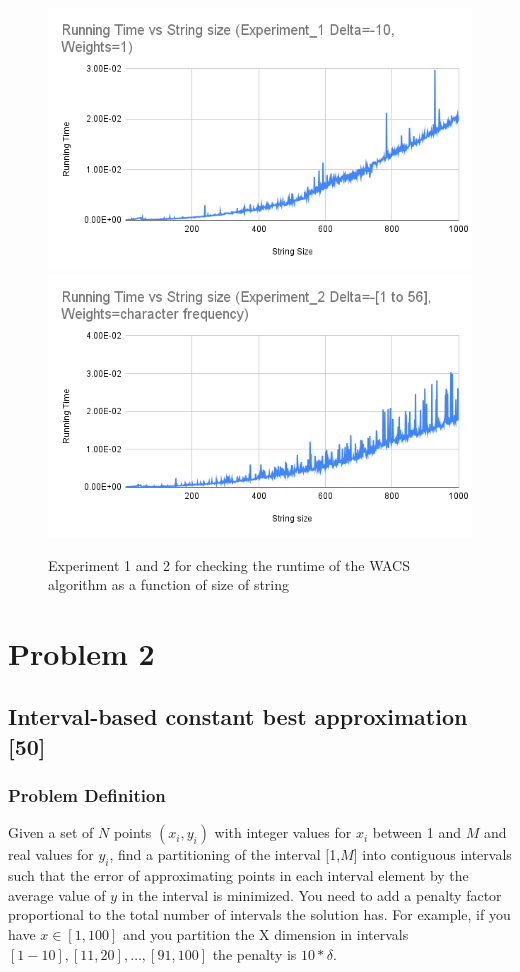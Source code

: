 \documentclass{article}
\begin{document}
\begin{figure}[htp]
    \centering
    \includegraphics[width=.40\textwidth]{Running Time vs String size (Experiment_1 Delta=-10, Weights=1).png}
    \includegraphics[width=.40\textwidth]{Running Time vs String size (Experiment_2 Delta=-[1 to 56], Weights=character frequency).png}
    \caption{Experiment 1 and 2 for checking the runtime of the WACS algorithm as a function of size of string}
    \label{fig:WACSrun}
\end{figure}
\clearpage
\section*{Problem 2}
\subsection*{Interval-based constant best approximation [50]} 
\subsubsection{Problem Definition}
Given a set of $N$ points $(x_i,y_i)$ with integer values for $x_i$ between 1 and $M$ and real values for $y_i$,  find a partitioning of the interval [1,$M$] into contiguous intervals such that the error of approximating points in each interval element by the average value of $y$ in the interval is minimized. You need to add a penalty factor proportional to the total number of intervals the solution has. For example, if you have $x \in [1,100]$ and you partition the X dimension in intervals $[1-10],[11,20],\ldots,[91,100]$ the penalty is $10*\delta$.
\end{document}
